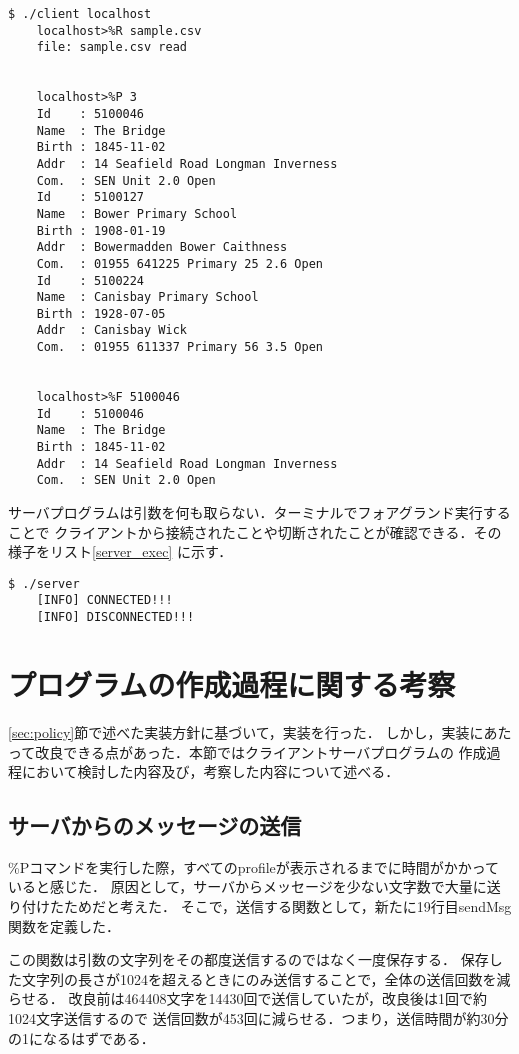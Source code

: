 \documentclass[11pt]{jarticle}
\begin{document}
\begin{lstlisting}[caption=クライアントプログラム実行例,label=client_exec]
    $ ./client localhost
    localhost>%R sample.csv
    file: sample.csv read


    localhost>%P 3
    Id    : 5100046
    Name  : The Bridge
    Birth : 1845-11-02
    Addr  : 14 Seafield Road Longman Inverness
    Com.  : SEN Unit 2.0 Open
    Id    : 5100127
    Name  : Bower Primary School
    Birth : 1908-01-19
    Addr  : Bowermadden Bower Caithness
    Com.  : 01955 641225 Primary 25 2.6 Open
    Id    : 5100224
    Name  : Canisbay Primary School
    Birth : 1928-07-05
    Addr  : Canisbay Wick
    Com.  : 01955 611337 Primary 56 3.5 Open


    localhost>%F 5100046
    Id    : 5100046
    Name  : The Bridge
    Birth : 1845-11-02
    Addr  : 14 Seafield Road Longman Inverness
    Com.  : SEN Unit 2.0 Open
\end{lstlisting}

サーバプログラムは引数を何も取らない．ターミナルでフォアグランド実行することで
クライアントから接続されたことや切断されたことが確認できる．その様子をリスト\ref{server_exec}
に示す．

\begin{lstlisting}[caption=サーバプログラムの実行例,label=server_exec]
    $ ./server 
    [INFO] CONNECTED!!!
    [INFO] DISCONNECTED!!!
\end{lstlisting}


\section{プログラムの作成過程に関する考察}

\ref{sec:policy}節で述べた実装方針に基づいて，実装を行った．
しかし，実装にあたって改良できる点があった．本節ではクライアントサーバプログラムの
作成過程において検討した内容及び，考察した内容について述べる．

\subsection{サーバからのメッセージの送信}

\%Pコマンドを実行した際，すべてのprofileが表示されるまでに時間がかかっていると感じた．
原因として，サーバからメッセージを少ない文字数で大量に送り付けたためだと考えた．
そこで，送信する関数として，新たに19行目sendMsg関数を定義した．

この関数は引数の文字列をその都度送信するのではなく一度保存する．
保存した文字列の長さが1024を超えるときにのみ送信することで，全体の送信回数を減らせる．
改良前は464408文字を14430回で送信していたが，改良後は1回で約1024文字送信するので
送信回数が453回に減らせる．つまり，送信時間が約30分の1になるはずである．
\end{document}
